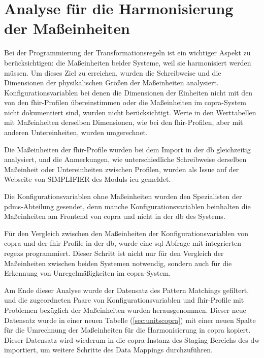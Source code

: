\section{Analyse für die Harmonisierung der Maßeinheiten} \label{sec:units}

Bei der Programmierung der Transformationsregeln ist ein wichtiger Aspekt zu berücksichtigen: die Maßeinheiten beider Systeme, weil sie harmonisiert werden müssen. Um dieses Ziel zu erreichen, wurden die Schreibweise und die Dimensionen der physikalischen Größen der Maßeinheiten analysiert. Konfigurationsvariablen bei denen die Dimensionen der Einheiten nicht mit den von den \ac{fhir}-Profilen übereinstimmen oder die Maßeinheiten im \ac{copra}-System nicht dokumentiert sind, wurden nicht berücksichtigt. Werte in den Werttabellen mit Maßeinheiten derselben Dimensionen, wie bei den \ac{fhir}-Profilen, aber mit anderen Untereinheiten, wurden umgerechnet.

Die Maßeinheiten der \ac{fhir}-Profile wurden bei dem Import in der \ac{db} gleichzeitig analysiert, und die Anmerkungen, wie unterschiedliche Schreibweise derselben Maßeinheit oder Untereinheiten zwischen Profilen, wurden als Issue auf der Webseite von SIMPLIFIER des Moduls \glqq\ac{icu}\grqq{} gemeldet.

Die Konfigurationsvariablen ohne Maßeinheiten wurden den Spezialisten der \ac{pdms}-Abteilung gesendet, denn manche Konfigurationsvariablen beinhalten die Maßeinheiten am Frontend von \ac{copra} und nicht in der \ac{db} des Systems.

Für den Vergleich zwischen den Maßeinheiten der Konfigurationsvariablen von \ac{copra} und der \ac{fhir}-Profile in der \ac{db}, wurde eine \ac{sql}-Abfrage mit integrierten \acp{regex} programmiert. Dieser Schritt ist nicht nur für den Vergleich der Maßeinheiten zwischen beiden Systemen notwendig, sondern auch für die Erkennung von Unregelmäßigkeiten im \ac{copra}-System.

Am Ende dieser Analyse wurde der Datensatz des Pattern Matchings gefiltert, und die zugeordneten Paare von Konfigurationsvariablen und \ac{fhir}-Profile mit Problemen bezüglich der Maßeinheiten wurden herausgenommen. Dieser neue Datensatz wurde in einer neuen Tabelle (\ref{sec:unitscopra}) mit einer neuen Spalte für die Umrechnung der Maßeinheiten für die Harmonisierung in \ac{copra} kopiert. Dieser Datensatz wird wiederum in die \ac{copra}-Instanz des Staging Bereichs des \ac{dw} importiert, um weitere Schritte des Data Mappings durchzuführen.